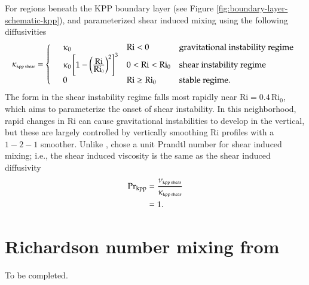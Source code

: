 For regions beneath the KPP boundary layer (see Figure
\ref{fig:boundary-layer-schematic-kpp}), \cite{LargeKPP} and
\cite{Large_Gent1999} parameterized shear induced mixing using the
following diffusivities
\begin{equation}
  \kappa_{\mbox{\tiny kpp shear}}= \left\{
\begin{array}{llll}
&\kappa_{0}  &\mbox{Ri} < 0  &\mbox{gravitational instability regime} 
 \\
   &\kappa_{0} \left[1- \left(\frac{\mbox{Ri}}{\mbox{Ri}_0}\right)^2 \right]^3
   &0 < \mbox{Ri}  <  \mbox{Ri}_0   &\mbox{shear instability regime}
\\
 &0 &\mbox{Ri} \ge \mbox{Ri}_{0} &\mbox{stable regime.} 
\end{array}
 \right.
\label{eq:kappa-shear-kpp}
\end{equation}
The form in the shear instability regime falls most rapidly near
$\mbox{Ri} = 0.4 \, \mbox{Ri}_{0}$, which aims to parameterize the
onset of shear instability. In this neighborhood, rapid changes in
$\mbox{Ri}$ can cause gravitational instabilities to develop in the
vertical, but these are largely controlled by vertically smoothing
$\mbox{Ri}$ profiles with a $1-2-1$ smoother.  Unlike \cite{PPvmix},
\cite{LargeKPP} chose a unit Prandtl number for shear induced mixing;
i.e., the shear induced viscosity is the same as the shear induced
diffusivity
\begin{subequations}
\begin{align}
  \mbox{Pr}_{\mbox{\scriptsize kpp}} &= \frac{\nu_{\mbox{\tiny kpp shear}}}{\kappa_{\mbox{\tiny kpp  shear}}} 
 \\
 &= 1.
\end{align}
\end{subequations}


\section{Richardson number mixing from \cite{Jacksonetal2008}}
\label{section:shear-instability-parameterized-jackson-etal}

To be completed. 